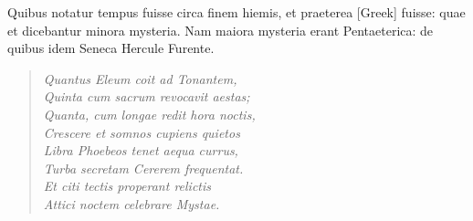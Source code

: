 Quibus notatur tempus fuisse circa finem hiemis, et praeterea
 \textgreek{[Greek]}
fuisse: quae et dicebantur minora mysteria.
Nam maiora mysteria
erant Pentaeterica: de quibus idem Seneca Hercule Furente.
\begin{quote}
  \emph{Quantus Eleum coit ad Tonantem,\\
  Quinta cum sacrum revocavit aestas;\\
  Quanta, cum longae redit hora noctis,\\
  Crescere et somnos cupiens quietos\\
  Libra Phoebeos tenet aequa currus,\\
  Turba secretam Cererem frequentat.\\
  Et citi tectis properant relictis\\
  Attici noctem celebrare Mystae.}
\end{quote}

